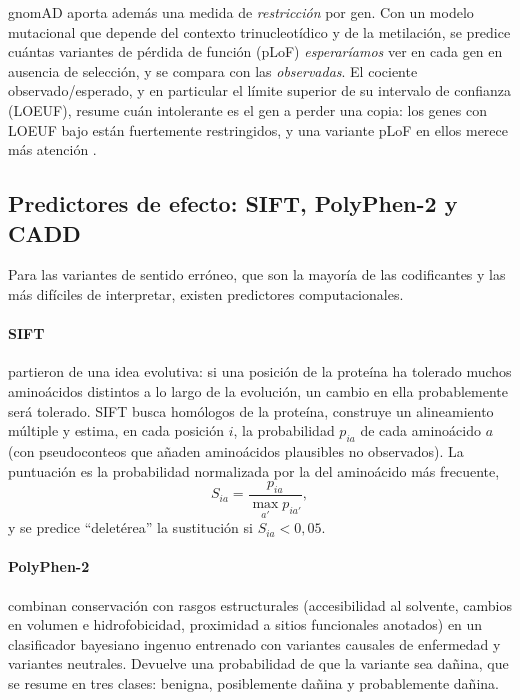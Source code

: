 gnomAD aporta además una medida de \emph{restricción} por gen. Con un modelo mutacional que depende del contexto trinucleotídico y de la metilación, se predice cuántas variantes de pérdida de función (pLoF) \emph{esperaríamos} ver en cada gen en ausencia de selección, y se compara con las \emph{observadas}. El cociente observado/esperado, y en particular el límite superior de su intervalo de confianza (LOEUF), resume cuán intolerante es el gen a perder una copia: los genes con LOEUF bajo están fuertemente restringidos, y una variante pLoF en ellos merece más atención \parencite{c09-karczewski2020}.

\subsection{Predictores de efecto: SIFT, PolyPhen-2 y CADD}

Para las variantes de sentido erróneo, que son la mayoría de las codificantes y las más difíciles de interpretar, existen predictores computacionales.

\paragraph{SIFT} \textcite{c09-ng2003} partieron de una idea evolutiva: si una posición de la proteína ha tolerado muchos aminoácidos distintos a lo largo de la evolución, un cambio en ella probablemente será tolerado. SIFT busca homólogos de la proteína, construye un alineamiento múltiple y estima, en cada posición $i$, la probabilidad $p_{ia}$ de cada aminoácido $a$ (con pseudoconteos que añaden aminoácidos plausibles no observados). La puntuación es la probabilidad normalizada por la del aminoácido más frecuente,
\begin{equation}\label{eq:09-sift}
S_{ia} = \frac{p_{ia}}{\max_{a'} p_{ia'}},
\end{equation}
y se predice ``deletérea'' la sustitución si $S_{ia}<0{,}05$.

\begin{simbolos}
\end{simbolos}

\paragraph{PolyPhen-2} \textcite{c09-adzhubei2010} combinan conservación con rasgos estructurales (accesibilidad al solvente, cambios en volumen e hidrofobicidad, proximidad a sitios funcionales anotados) en un clasificador bayesiano ingenuo entrenado con variantes causales de enfermedad y variantes neutrales. Devuelve una probabilidad de que la variante sea dañina, que se resume en tres clases: benigna, posiblemente dañina y probablemente dañina.

